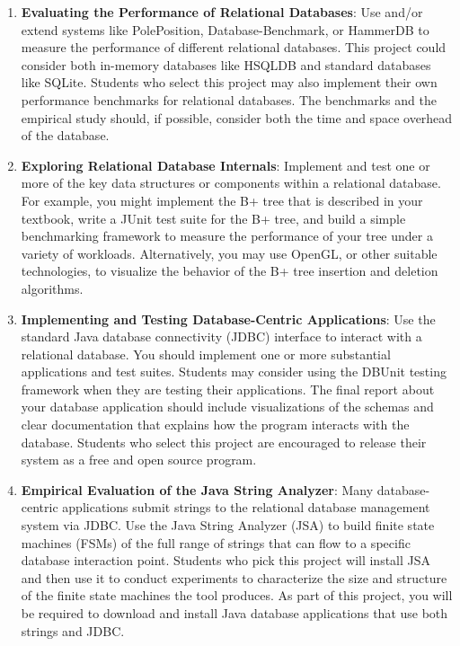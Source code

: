 \begin{enumerate}

  \item {\bf Evaluating the Performance of Relational Databases}: Use and/or extend systems like PolePosition,
    Database-Benchmark, or HammerDB to measure the performance of different relational databases.  This project could
    consider both in-memory databases like HSQLDB and standard databases like SQLite.  Students who select this project
    may also implement their own performance benchmarks for relational databases.  The benchmarks and
    the empirical study should, if possible, consider both the time and space overhead of the database.

  \item {\bf Exploring Relational Database Internals}: Implement and test one or more of the key data structures or
    components within a relational database.  For example, you might implement the B+ tree that is described in your
    textbook, write a JUnit test suite for the B+ tree, and build a simple benchmarking framework to measure the
    performance of your tree under a variety of workloads.  Alternatively, you may use OpenGL, or other suitable
    technologies, to visualize the behavior of the B+ tree insertion and deletion algorithms.

  \item {\bf Implementing and Testing Database-Centric Applications}: Use the standard Java database connectivity (JDBC)
    interface to interact with a relational database.  You should implement one or more substantial applications and
    test suites.  Students may consider using the DBUnit testing framework when they are testing their applications.
    The final report about your database application should include visualizations of the schemas and clear
    documentation that explains how the program interacts with the database.  Students who select this project are
    encouraged to release their system as a free and open source program.  

  \item {\bf Empirical Evaluation of the Java String Analyzer}: Many database-centric applications submit strings to the
    relational database management system via JDBC.  Use the Java String Analyzer (JSA) to build finite state machines
    (FSMs) of the full range of strings that can flow to a specific database interaction point.  Students who pick this
    project will install JSA and then use it to conduct experiments to characterize the size and structure of the finite
    state machines the tool produces.  As part of this project, you will be required to download and install Java
    database applications that use both strings and JDBC.  


\end{enumerate}
